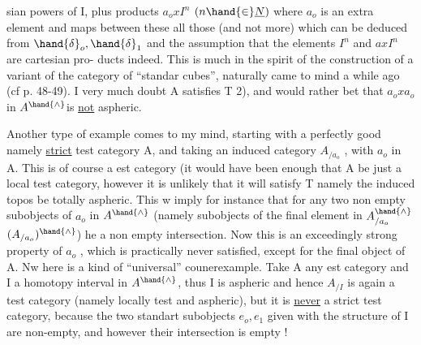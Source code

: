 sian powers of I, plus products $a_{o}xI^{n}$ $(n\hand{\in}\underline{N})$  where $a_{o}$ is an extra element\hand{,}
and  maps between these all those (and not more) which can be deduced from
$\hand{\delta}_{o},\hand{\delta}_{1}$ and the assumption that the elements $I^{n}$ and $axI^{n}$ are cartesian pro-%
ducts indeed. This is much in the spirit of the construction of a variant
of the category \hand{\ensuremath{\square}} of ``standar cubes'',  naturally came to mind
a while ago (cf p. 48-49). I very much doubt A satisfies T 2), and would
rather bet that $a_{o}xa_{o}$ in $A^{\hand{\wedge}}$is \uline{not} aspheric.

Another type of example comes to my mind, starting with a perfectly
good \hand{(}namely \uline{strict}\hand{)} test category A, and taking an induced category
$A_{/a_{o}}$ , with $a_{o}$ in A. This is of course a est category (it would have been
enough that A be just a local test category\hand{)}, however it is unlikely that
it will satisfy T namely the induced topos be totally aspheric. This
w imply for instance that for any two  non empty subobjects of
$a_{o}$ in $A^{\hand{\wedge}}$ (namely subobjects of the final element in $A^{\hand{\wedge}}_{/a_{o}}$ \hand{\ensuremath{\simeq}} $(A_{/a_{o}})^{\hand{\wedge}}$) he a
non empty intersection. Now this is an exceedingly strong property of $a_{o}$ ,
which is practically never satisfied, except for the final object of A.
Nw here is a kind of ``universal'' counerexample. Take A any est category
and I a homotopy interval in $A^{\hand{\wedge}}$, thus I is aspheric and hence $A_{/I}$ is
again a test category (namely locally test and aspheric), but it is \uline{never}
a strict test category, because the two standart subobjects $e_{o},e_{1}$ given
with the structure of I are non-empty, and however their intersection is
empty !

